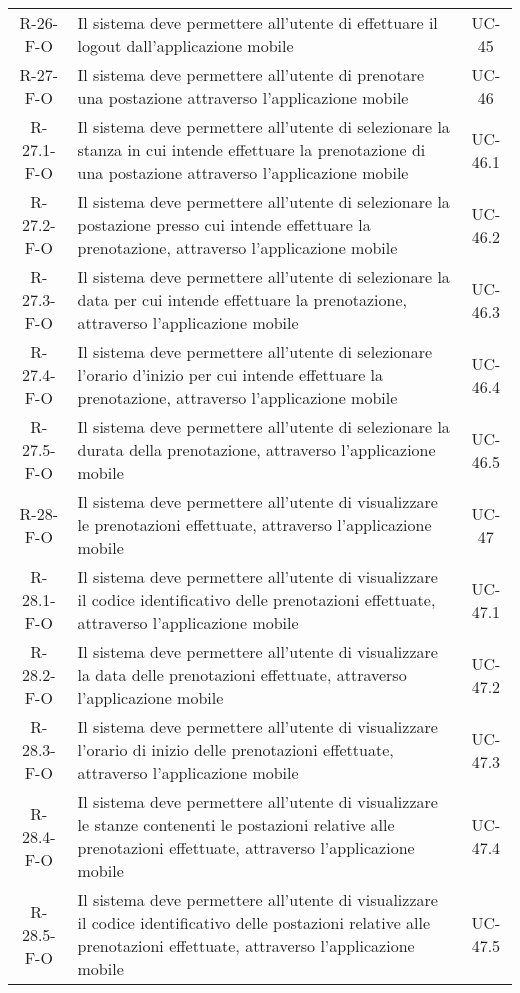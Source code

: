 \begin{longtable}{ c C{9.5cm} c }
    R-26-F-O & Il sistema deve permettere all'utente di effettuare il logout dall'applicazione mobile& UC-45\\
    R-27-F-O & Il sistema deve permettere all'utente di prenotare una postazione attraverso l'applicazione mobile& UC-46\\
    R-27.1-F-O & Il sistema deve permettere all'utente di selezionare la stanza in cui intende effettuare la prenotazione di una postazione attraverso l'applicazione mobile& UC-46.1\\
    R-27.2-F-O & Il sistema deve permettere all'utente di selezionare la postazione presso cui intende effettuare la prenotazione, attraverso l'applicazione mobile& UC-46.2\\
    R-27.3-F-O & Il sistema deve permettere all'utente di selezionare la data per cui intende effettuare la prenotazione, attraverso l'applicazione mobile& UC-46.3\\
    R-27.4-F-O & Il sistema deve permettere all'utente di selezionare l'orario d'inizio per cui intende effettuare la prenotazione, attraverso l'applicazione mobile& UC-46.4\\
    R-27.5-F-O & Il sistema deve permettere all'utente di selezionare la durata della prenotazione, attraverso l'applicazione mobile& UC-46.5\\
    R-28-F-O & Il sistema deve permettere all'utente di visualizzare le prenotazioni effettuate, attraverso l'applicazione mobile& UC-47\\
    R-28.1-F-O & Il sistema deve permettere all'utente di visualizzare il codice identificativo delle prenotazioni effettuate, attraverso l'applicazione mobile& UC-47.1\\
    R-28.2-F-O & Il sistema deve permettere all'utente di visualizzare la data delle prenotazioni effettuate, attraverso l'applicazione mobile& UC-47.2\\
    R-28.3-F-O & Il sistema deve permettere all'utente di visualizzare l'orario di inizio delle prenotazioni effettuate, attraverso l'applicazione mobile& UC-47.3\\
    R-28.4-F-O & Il sistema deve permettere all'utente di visualizzare le stanze contenenti le postazioni relative alle prenotazioni effettuate, attraverso l'applicazione mobile& UC-47.4\\
    R-28.5-F-O & Il sistema deve permettere all'utente di visualizzare il codice identificativo delle postazioni relative alle prenotazioni effettuate, attraverso l'applicazione mobile& UC-47.5\\

\end{longtable}
